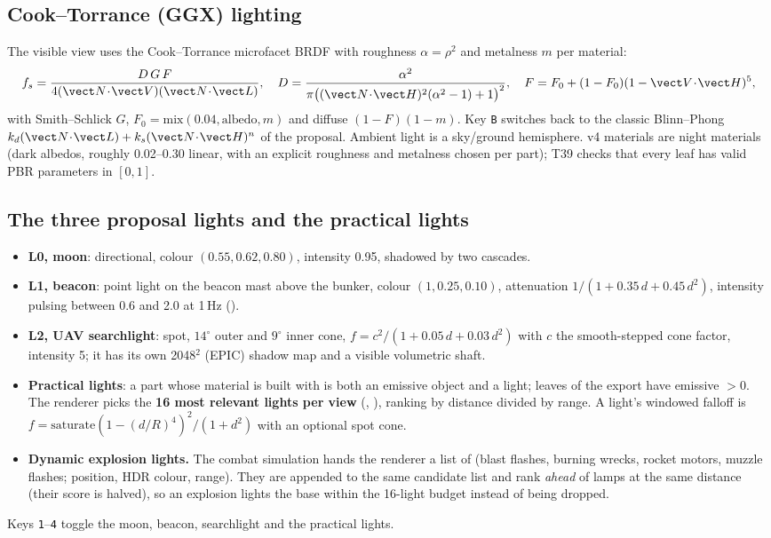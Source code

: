 \subsection{Cook--Torrance (GGX) lighting}
The visible view uses the Cook--Torrance microfacet BRDF with roughness $\alpha=\rho^2$ and metalness $m$ per material:
\begin{equation}
  f_s=\frac{D\,G\,F}{4(\vect N\!\cdot\!\vect V)(\vect N\!\cdot\!\vect L)},\quad
  D=\frac{\alpha^2}{\pi\big((\vect N\!\cdot\!\vect H)^2(\alpha^2-1)+1\big)^2},\quad
  F=F_0+(1-F_0)(1-\vect V\!\cdot\!\vect H)^5,
\end{equation}
with Smith--Schlick $G$, $F_0=\mathrm{mix}(0.04,\text{albedo},m)$ and diffuse $(1-F)(1-m)$. Key \texttt{B} switches back
to the classic Blinn--Phong $k_d(\vect N\!\cdot\!\vect L)+k_s(\vect N\!\cdot\!\vect H)^n$ of the proposal. Ambient light
is a sky/ground hemisphere. v4 materials are night materials (dark albedos, roughly 0.02--0.30 linear, with an explicit roughness and
metalness chosen per part); T39 checks that every leaf has valid PBR parameters in $[0,1]$.

\subsection{The three proposal lights and the practical lights}
\begin{itemize}
  \item \textbf{L0, moon}: directional, colour $(0.55,0.62,0.80)$, intensity 0.95, shadowed by two cascades.
  \item \textbf{L1, beacon}: point light on the beacon mast above the bunker, colour $(1,0.25,0.10)$,
  attenuation $1/(1+0.35\,d+0.45\,d^2)$, intensity pulsing between 0.6 and 2.0 at 1\,Hz ().
  \item \textbf{L2, UAV searchlight}: spot, $14^\circ$ outer and $9^\circ$ inner cone,
  $f=c^2/(1+0.05\,d+0.03\,d^2)$ with $c$ the smooth-stepped cone factor, intensity 5; it has its own 2048$^2$ (EPIC) shadow map
  and a visible volumetric shaft.
  \item \textbf{Practical lights}: a part whose material is built with 
  is both an emissive object and a light; \nEmissive{} leaves of the export have emissive $>0$. The renderer picks the
  \textbf{16 most relevant lights per view} (, ), ranking by distance divided
  by range. A light's windowed falloff is $f=\mathrm{saturate}(1-(d/R)^4)^2/(1+d^2)$ with an optional spot cone.
  \item \textbf{Dynamic explosion lights.} The combat simulation hands the renderer a list of 
  (blast flashes, burning wrecks, rocket motors, muzzle flashes; position, HDR colour, range). They are appended to the same
  candidate list and rank \emph{ahead} of lamps at the same distance (their score is halved), so an explosion lights
  the base within the 16-light budget instead of being dropped.
\end{itemize}
Keys \texttt{1}--\texttt{4} toggle the moon, beacon, searchlight and the practical lights.

